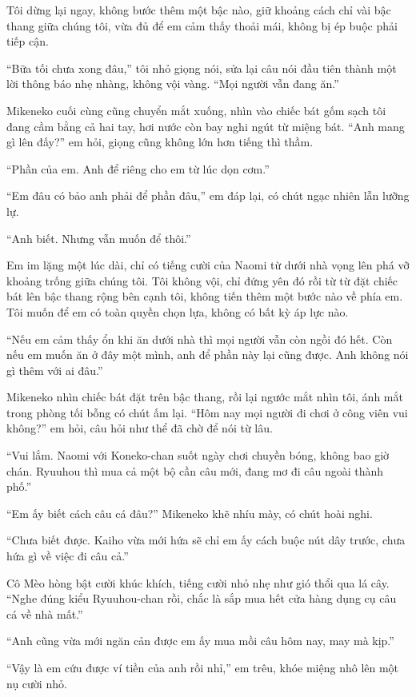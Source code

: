 ﻿\documentclass[../main.tex]{subfiles}
\begin{document}
Tôi dừng lại ngay, không bước thêm một bậc nào, giữ khoảng cách chỉ vài bậc thang giữa chúng tôi, vừa đủ để em cảm thấy thoải mái, không bị ép buộc phải tiếp cận.

``Bữa tối chưa xong đâu,'' tôi nhỏ giọng nói, sửa lại câu nói đầu tiên thành một lời thông báo nhẹ nhàng, không vội vàng. ``Mọi người vẫn đang ăn.''

Mikeneko cuối cùng cũng chuyển mắt xuống, nhìn vào chiếc bát gốm sạch tôi đang cầm bằng cả hai tay, hơi nước còn bay nghi ngút từ miệng bát. ``Anh mang gì lên đấy?'' em hỏi, giọng cũng không lớn hơn tiếng thì thầm.

``Phần của em. Anh để riêng cho em từ lúc dọn cơm.''

``Em đâu có bảo anh phải để phần đâu,'' em đáp lại, có chút ngạc nhiên lẫn lưỡng lự.

``Anh biết. Nhưng vẫn muốn để thôi.''

Em im lặng một lúc dài, chỉ có tiếng cười của Naomi từ dưới nhà vọng lên phá vỡ khoảng trống giữa chúng tôi. Tôi không vội, chỉ đứng yên đó rồi từ từ đặt chiếc bát lên bậc thang rộng bên cạnh tôi, không tiến thêm một bước nào về phía em. Tôi muốn để em có toàn quyền chọn lựa, không có bất kỳ áp lực nào.

``Nếu em cảm thấy ổn khi ăn dưới nhà thì mọi người vẫn còn ngồi đó hết. Còn nếu em muốn ăn ở đây một mình, anh để phần này lại cũng được. Anh không nói gì thêm với ai đâu.''

Mikeneko nhìn chiếc bát đặt trên bậc thang, rồi lại ngước mắt nhìn tôi, ánh mắt trong phòng tối bỗng có chút ấm lại. ``Hôm nay mọi người đi chơi ở công viên vui không?'' em hỏi, câu hỏi như thể đã chờ để nói từ lâu.

``Vui lắm. Naomi với Koneko-chan suốt ngày chơi chuyền bóng, không bao giờ chán. Ryuuhou thì mua cả một bộ cần câu mới, đang mơ đi câu ngoài thành phố.''

``Em ấy biết cách câu cá đâu?'' Mikeneko khẽ nhíu mày, có chút hoài nghi.

``Chưa biết được. Kaiho vừa mới hứa sẽ chỉ em ấy cách buộc nút dây trước, chưa hứa gì về việc đi câu cả.''

Cô Mèo hòng bật cười khúc khích, tiếng cười nhỏ nhẹ như gió thổi qua lá cây. ``Nghe đúng kiểu Ryuuhou-chan rồi, chắc là sắp mua hết cửa hàng dụng cụ câu cá về nhà mất.''

``Anh cũng vừa mới ngăn cản được em ấy mua mồi câu hôm nay, may mà kịp.''

``Vậy là em cứu được ví tiền của anh rồi nhỉ,'' em trêu, khóe miệng nhô lên một nụ cười nhỏ.
\end{document}
